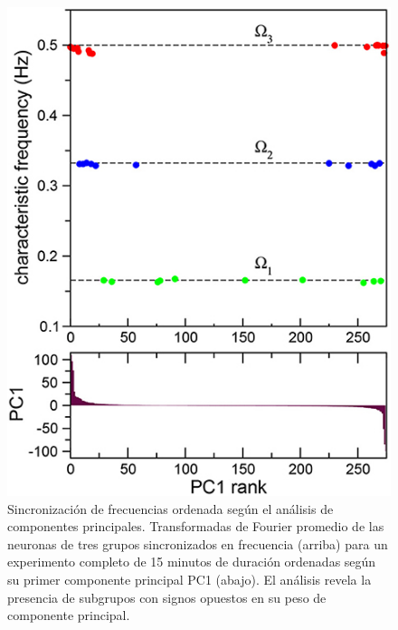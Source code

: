  \begin{figure}[h!]
	\centering\includegraphics[width=\imsize]{sincronia3.jpg}
	\caption[ Sincronización de frecuencias ordenada según el análisis de componentes principales.]{Sincronización de frecuencias ordenada según el análisis de componentes principales. Transformadas de Fourier promedio de las neuronas de tres grupos sincronizados en frecuencia (arriba) para un experimento completo de 15 minutos de duración ordenadas según su primer componente principal PC1 (abajo). El análisis revela la presencia de subgrupos con signos opuestos en su peso de componente principal.}\label{fig:sincronia_3}
\end{figure}

